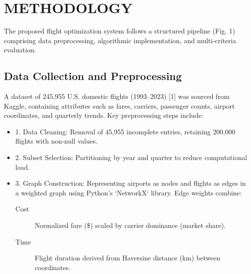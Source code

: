 \documentclass[conference]{IEEEtran}
\begin{document}
\section{METHODOLOGY}
The proposed flight optimization system follows a structured pipeline (Fig. 1) comprising data preprocessing, algorithmic implementation, and multi-criteria evaluation.  
\subsection{Data Collection and Preprocessing}
A dataset of 245,955 U.S. domestic flights (1993–2023) [1] was sourced from Kaggle, containing attributes such as fares, carriers, passenger counts, airport coordinates, and quarterly trends. Key preprocessing steps include:  
\begin{itemize}
    \item 1. Data Cleaning: Removal of 45,955 incomplete entries, retaining 200,000 flights with non-null values.  
    \item 2. Subset Selection: Partitioning by year and quarter to reduce computational load.  
    \item 3. Graph Construction: Representing airports as nodes and flights as edges in a weighted graph using Python’s `NetworkX` library. Edge weights combine:  
    \begin{description}
        \item [Cost] Normalized fare (\$) scaled by carrier dominance (market share).  
        \item [Time] Flight duration derived from Haversine distance (km) between coordinates.  
    \end{description}   

\end{itemize}
\end{document}
